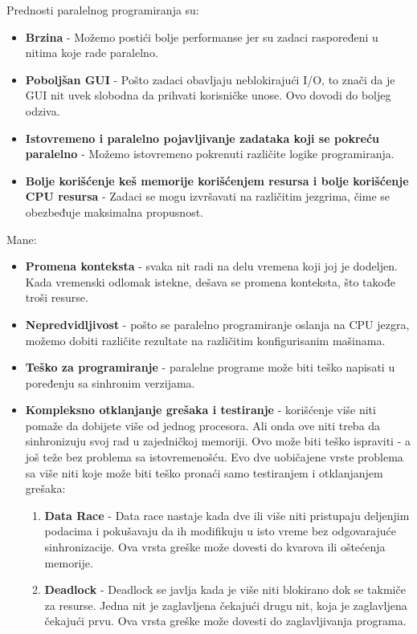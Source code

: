 \documentclass[a4paper]{article}
\begin{document}
{Prednosti paralelnog programiranja su:
\begin{itemize}
\item \textbf{Brzina} - Možemo postići bolje performanse jer su zadaci raspoređeni u nitima koje rade paralelno.\cite{zoboko}
\item \textbf{Poboljšan GUI} - Pošto zadaci obavljaju neblokirajući I/O, to znači da je GUI nit uvek slobodna da prihvati korisničke unose. Ovo dovodi do boljeg odziva.\cite{zoboko}
\item \textbf{Istovremeno i paralelno pojavljivanje zadataka koji se pokreću paralelno} - Možemo istovremeno pokrenuti različite logike programiranja.\cite{zoboko}
\item \textbf{Bolje korišćenje keš memorije korišćenjem resursa i bolje korišćenje CPU resursa} - Zadaci se mogu izvršavati na različitim jezgrima, čime se obezbeđuje maksimalna propusnost.\cite{zoboko}\\
\end{itemize}
Mane:
\begin{itemize}
\item \textbf{Promena konteksta} - svaka nit radi na delu vremena koji joj je dodeljen. Kada vremenski odlomak istekne, dešava se promena konteksta, što takođe troši resurse.\cite{zoboko}
\item \textbf{Nepredvidljivost} - pošto se paralelno programiranje oslanja na CPU jezgra, možemo dobiti različite rezultate na različitim konfigurisanim mašinama.\cite{zoboko}
\item \textbf{Teško za programiranje} - paralelne programe može biti teško napisati u poređenju sa sinhronim verzijama.\cite{zoboko}
\item \textbf{Kompleksno otklanjanje grešaka i testiranje} - korišćenje više niti pomaže da dobijete više od jednog procesora. Ali onda ove niti treba da sinhronizuju svoj rad u zajedničkoj memoriji. Ovo može biti teško ispraviti - a još teže bez problema sa istovremenošću\cite{zoboko}.
Evo dve uobičajene vrste problema sa više niti koje može biti teško pronaći samo testiranjem i otklanjanjem grešaka:
\begin{enumerate}
\item \textbf{Data Race} - 
Data race nastaje kada dve ili više niti pristupaju deljenjim podacima i pokušavaju da ih modifikuju u isto vreme bez odgovarajuće sinhronizacije. Ova vrsta greške može dovesti do kvarova ili oštećenja memorije.\cite{perforce}
\item \textbf{Deadlock} - 
Deadlock se javlja kada je više niti blokirano dok se takmiče za resurse. Jedna nit je zaglavljena čekajući drugu nit, koja je zaglavljena čekajući prvu. Ova vrsta greške može dovesti do zaglavljivanja programa.\cite{perforce}
\end{enumerate}
\end{itemize}

}
\end{document}

